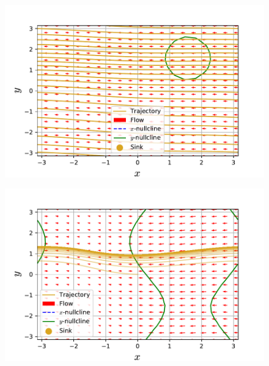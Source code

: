 \documentclass[../main]{subfiles}
\begin{document}
\captionsetup[figure]{justification=centering}
\begin{figure}[tbp]
    \begin{minipage}[b]{0.47\linewidth}
      \centering
      \includegraphics[keepaspectratio, scale=0.42]{images/phase_a4K2.pdf}
      \label{fig:phase-k2}
    \end{minipage}
    \begin{minipage}[b]{0.47\linewidth}
      \centering
      \includegraphics[keepaspectratio, scale=0.42]{images/phase_a4K10.pdf}
      \label{fig:phase-k10}
    \end{minipage}\\
    \begin{minipage}[b]{0.47\linewidth}

\end{minipage}
\end{figure}
\end{document}
